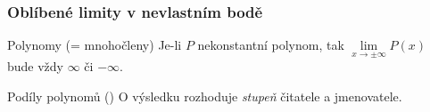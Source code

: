 \documentclass[handout]%
{beamer}
\begin{document}
\begin{frame}
	\frametitle{Oblíbené limity v nevlastním bodě}\pause
	\begin{exampleblock}{Polynomy (= mnohočleny)}\pause
	Je-li $P$ nekonstantní polynom, tak $\lim\limits_{x \to \pm\infty} P(x)$ bude vždy $\infty$ či $-\infty$.
	\end{exampleblock}
	
	\pause
	
	\begin{exampleblock}{Podíly polynomů ()}\pause
	O výsledku rozhoduje \emph{stupeň} čitatele a jmenovatele.
	\end{exampleblock}
	
\end{frame}
\end{document}
